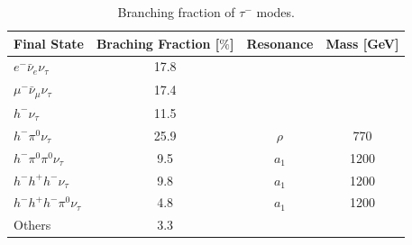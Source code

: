 \begin{table}[ht]
\begin{center}
\begin{tabular}{|l|c|c|c|}
  \hline \hline 
  Final State                                            &  Braching Fraction [$\%$] &  Resonance & Mass [GeV]   \\ \hline\hline
   $e^{-}\bar{\nu}_{e}\nu_{\tau}$                        & 17.8                    &            &   \\ \hline
   $\mu^{-}\bar{\nu}_{\mu}\nu_{\tau}$                    & 17.4                    &            &   \\ \hline \hline 
   $h^{-}\nu_{\tau}$                                     & 11.5                    &            &   \\ \hline
   $h^{-}\pi^{0}\nu_{\tau}$                              & 25.9                    & $\rho$     & 770 \\ \hline
   $h^{-}\pi^{0}\pi^{0}\nu_{\tau}$                       &  9.5                    & $a_{1}$    & 1200  \\ \hline
   $h^{-}h^{+}h^{-}\nu_{\tau}$                           &  9.8                    & $a_{1}$    & 1200  \\ \hline
   $h^{-}h^{+}h^{-}\pi^{0}\nu_{\tau}$                    &  4.8                    & $a_{1}$    & 1200  \\ \hline
   Others                                                &  3.3                    &            &       \\ \hline 
   
  \hline
\end{tabular}
\end{center}
\caption{Branching fraction of $\tau^{-}$ modes\cite{PDG}.}\label{tab:taumodescomplete}
\end{table}


